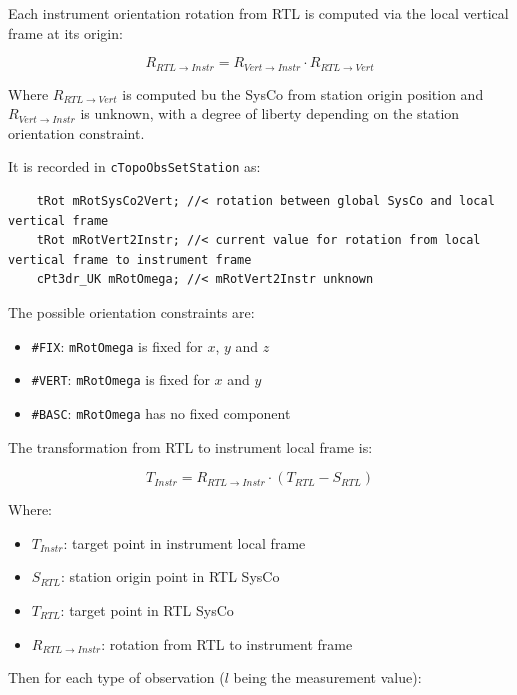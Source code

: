 Each instrument orientation rotation from RTL is computed via the local vertical frame at its origin:

\begin{equation}
  R_{RTL \rightarrow Instr} = R_{Vert \rightarrow Instr} \cdot R_{RTL \rightarrow Vert}
\end{equation}


Where $R_{RTL \rightarrow Vert}$ is computed bu the SysCo from station origin position and
$R_{Vert \rightarrow Instr}$ is unknown, with a degree of liberty depending on the station orientation constraint.

It is recorded in \texttt{cTopoObsSetStation} as:

\begin{lstlisting}
    tRot mRotSysCo2Vert; //< rotation between global SysCo and local vertical frame
    tRot mRotVert2Instr; //< current value for rotation from local vertical frame to instrument frame
    cPt3dr_UK mRotOmega; //< mRotVert2Instr unknown
\end{lstlisting}

The possible orientation constraints are:
\begin{itemize}
   \item \texttt{\#FIX}: \texttt{mRotOmega} is fixed for $x$, $y$ and $z$
   \item \texttt{\#VERT}: \texttt{mRotOmega} is fixed for $x$ and $y$
   \item \texttt{\#BASC}: \texttt{mRotOmega} has no fixed component
\end{itemize}


The transformation from RTL to instrument local frame is:

\begin{equation}
    T_{Instr} = R_{RTL \rightarrow Instr} \cdot (T_{RTL} - S_{RTL})
\end{equation}

Where:

 \begin{itemize}
    \item $T_{Instr}$: target point in instrument local frame
    \item $S_{RTL}$: station origin point in RTL SysCo
    \item $T_{RTL}$: target point in RTL SysCo
    \item $R_{RTL \rightarrow Instr}$: rotation from RTL to instrument frame
 \end{itemize}


Then for each type of observation ($l$ being the measurement value):
 
